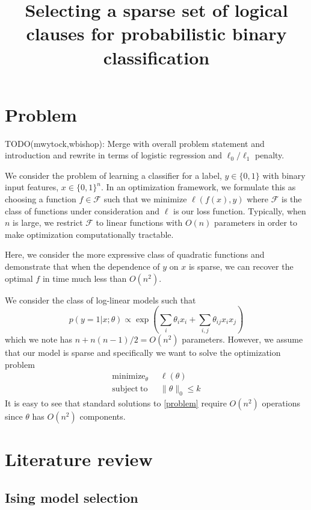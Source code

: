 \documentclass[12pt]{article}
\title{Selecting a sparse set of logical clauses for probabilistic binary classification}
\DeclareMathOperator*{\minimize}{\mathrm{minimize}}
\DeclareMathOperator*{\subjectto}{subject\;to}
\begin{document}
\maketitle

\section{Problem}

TODO(mwytock,wbishop): Merge with overall problem statement and introduction and rewrite in terms of logistic regression and $\ell_0/\ell_1$ penalty.

We consider the problem of learning a classifier for a label, $y \in \{0,1\}$ with binary input features, $x \in \{0,1\}^n$. In an optimization framework, we formulate this as choosing a function $f \in \mathcal{F}$ such that we minimize $\ell(f(x), y)$ where $\mathcal{F}$ is the class of functions under consideration and $\ell$ is our loss function. Typically, when $n$ is large, we restrict $\mathcal{F}$ to linear functions with $O(n)$ parameters in order to make optimization computationally tractable. 

Here, we consider the more expressive class of quadratic functions and demonstrate that when the dependence of $y$ on $x$ is sparse, we can recover the optimal $f$ in time much less than $O(n^2)$.

We consider the class of log-linear models such that
\begin{equation}
\label{model}
p(y = 1|x;\theta) \propto \exp \left(\sum_i\theta_ix_i + \sum_{i,j}\theta_{ij}x_ix_j\right)
\end{equation}
which we note has $n + n(n-1)/2 = O(n^2)$ parameters. However, we assume that our model is sparse and specifically we want to solve the optimization problem 
\begin{equation}
\label{problem}
\begin{split}
\minimize_\theta \;\; & \ell(\theta) \\
\subjectto \;\; & \|\theta\|_0 \le k
\end{split}
\end{equation}
It is easy to see that standard solutions to \eqref{problem} require $O(n^2)$ operations since $\theta$ has $O(n^2)$ components. 

\section{Literature review}

\subsection{Ising model selection}
\end{document}
